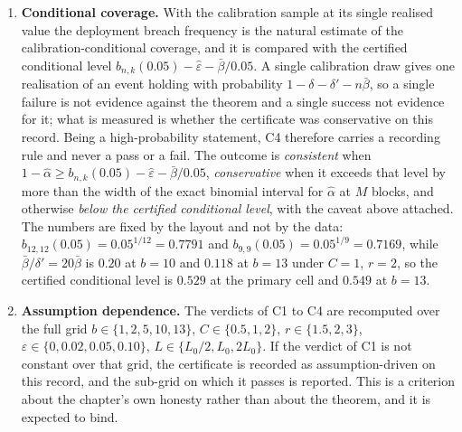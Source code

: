 \documentclass[../../../main.tex]{subfiles}
\begin{document}
\begin{enumerate}[label=\textbf{C\arabic*.},leftmargin=2.2\parindent]
C3 carries the mirror image of C1's defect, and worse. Its bound is positive in only $2$ of the same $180$ cells -- $b=10$, $r=3$, $\varepsilon=0$, at $C=0.5$ and $C=1$, where it is $0.0166$ and $0.0101$ -- and negative everywhere else, so $\hat\alpha\ge0$ cannot fall below it and C3 cannot fail. Even there, failure needs $\hat\alpha$ below about $0.017$ with $M$ between twelve and twenty-five, that is exactly zero breaches. At the primary cell the bound is $-0.157$ and the two-sided companion has nothing to test on this record. The primary cell is not moved on that account, since moving it would be choosing a cell for the outcome it can produce; instead C3 is recorded as \emph{not informative} wherever its bound is negative, the count $2/180$ is printed beside it, and the two live cells are named in the table.
\item \textbf{Conditional coverage.} With the calibration sample at its single realised value the deployment breach frequency is the natural estimate of the calibration-conditional coverage, and it is compared with the certified conditional level $b_{n,k}(0.05)-\hat\varepsilon-\bar\beta/0.05$. A single calibration draw gives one realisation of an event holding with probability $1-\delta-\delta'-n\bar\beta$, so a single failure is not evidence against the theorem and a single success not evidence for it; what is measured is whether the certificate was conservative on this record. Being a high-probability statement, C4 therefore carries a recording rule and never a pass or a fail. The outcome is \emph{consistent} when $1-\hat\alpha\ge b_{n,k}(0.05)-\hat\varepsilon-\bar\beta/0.05$, \emph{conservative} when it exceeds that level by more than the width of the exact binomial interval for $\hat\alpha$ at $M$ blocks, and otherwise \emph{below the certified conditional level}, with the caveat above attached. The numbers are fixed by the layout and not by the data: $b_{12,12}(0.05)=0.05^{1/12}=0.7791$ and $b_{9,9}(0.05)=0.05^{1/9}=0.7169$, while $\bar\beta/\delta'=20\bar\beta$ is $0.20$ at $b=10$ and $0.118$ at $b=13$ under $C=1$, $r=2$, so the certified conditional level is $0.529$ at the primary cell and $0.549$ at $b=13$.
\item \textbf{Assumption dependence.} The verdicts of C1 to C4 are recomputed over the full grid $b\in\{1,2,5,10,13\}$, $C\in\{0.5,1,2\}$, $r\in\{1.5,2,3\}$, $\varepsilon\in\{0,0.02,0.05,0.10\}$, $L\in\{L_0/2,L_0,2L_0\}$. If the verdict of C1 is not constant over that grid, the certificate is recorded as assumption-driven on this record, and the sub-grid on which it passes is reported. This is a criterion about the chapter's own honesty rather than about the theorem, and it is expected to bind.
\end{enumerate}
\end{document}
